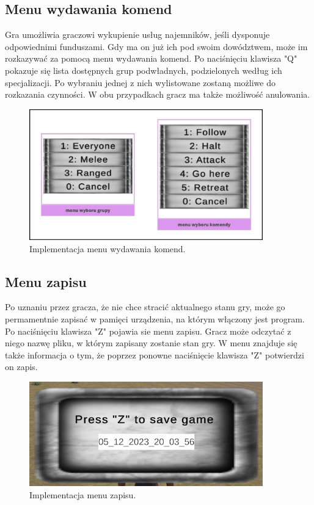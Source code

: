 \subsection{Menu wydawania komend}
Gra umożliwia graczowi wykupienie usług najemników, jeśli dysponuje odpowiednimi funduszami. Gdy ma on już ich pod swoim dowództwem, może im rozkazywać za pomocą 
menu wydawania komend. Po naciśnięciu klawisza "Q" pokazuje się lista dostępnych grup podwładnych, podzielonych według ich specjalizacji. Po wybraniu jednej z nich 
wylistowane zostaną możliwe do rozkazania czynności. W obu przypadkach gracz ma także możliwość anulowania. 
\begin{figure}[htbp]
    \centering
    \includegraphics[width=0.9\textwidth]{images/ui/opis_ekementow_mwnu_wyboru_komendy.png}
    \caption{Implementacja menu wydawania komend.}\label{fig:cmd_menu}
\end{figure}

\subsection{Menu zapisu}
Po uznaniu przez gracza, że nie chce stracić aktualnego stanu gry, może go permamentnie zapisać w pamięci urządzenia, na którym włączony jest program. Po naciśnięciu 
klawisza "Z" pojawia sie menu zapisu. Gracz może odczytać z niego nazwę pliku, w którym zapisany zostanie stan gry. W menu znajduje się także informacja o tym, że 
poprzez ponowne naciśnięcie klawisza "Z" potwierdzi on zapis. 
\begin{figure}[htbp]
    \centering
    \includegraphics[width=0.9\textwidth]{images/ui/menu_zapisu.png}
    \caption{Implementacja menu zapisu.}\label{fig:men_zap}
\end{figure}

